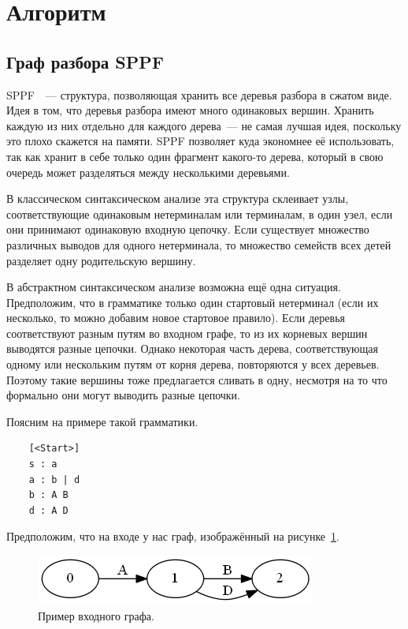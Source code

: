 \section{Алгоритм}
\subsection{Граф разбора SPPF}

SPPF~\cite{RNGLR}~--- структура, позволяющая хранить все деревья разбора в сжатом виде. Идея в том, что деревья разбора имеют много одинаковых вершин. Хранить каждую из них отдельно для каждого дерева~--- не самая лучшая идея, поскольку это плохо скажется на памяти. SPPF позволяет куда экономнее её использовать, так как хранит в себе только один фрагмент какого-то дерева, который в свою очередь может разделяться между несколькими деревьями. 

В классическом синтаксическом анализе эта структура склеивает узлы, соответствующие одинаковым нетерминалам или терминалам, в один  узел, если они принимают одинаковую входную цепочку. Если существует множество различных выводов для одного нетерминала, то множество семейств всех детей разделяет одну родительскую вершину. 

В абстрактном синтаксическом анализе возможна ещё одна ситуация. Предположим, что в грамматике только один стартовый нетерминал (если их несколько, то можно добавим новое стартовое правило). Если деревья соответствуют разным путям во входном графе, то из их корневых вершин выводятся разные цепочки. Однако некоторая часть дерева, соответствующая одному или нескольким путям от корня дерева, повторяются у всех деревьев. Поэтому такие вершины тоже предлагается сливать в одну, несмотря на то что формально они могут выводить разные цепочки. 

Поясним на примере такой грамматики.

\begin{verbatim}
    [<Start>] 
    s : a 
    a : b | d 
    b : A B
    d : A D 
\end{verbatim}

Предположим, что на входе у нас граф, изображённый на рисунке~\ref{sppf_input}.

\begin{figure}[t]
\centering
\includegraphics[width=0.5\linewidth]{Ivanov/Pictures/SPPF_input.png}
\caption{Пример входного графа.}
\label{sppf_input}
\end{figure}

